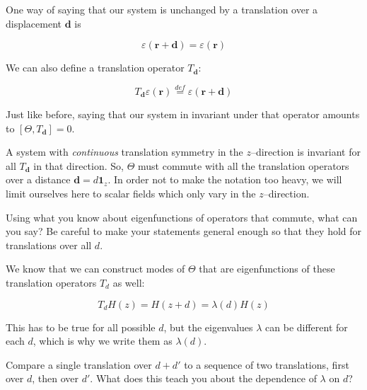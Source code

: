 \pagebreak


One way of saying that our system is unchanged by a translation over a displacement ${\mathbf d}$ is

\begin{equation}
\varepsilon ({\mathbf r} + {\mathbf d}) =  \varepsilon ({\mathbf r})
\end{equation} 

We can also define a translation operator $T_{\mathbf d}$:

\begin{equation}
T_{\mathbf d} \varepsilon ({\mathbf r}) \stackrel{def}{=} \varepsilon ({\mathbf r} + {\mathbf d})
\end{equation} 

Just like before, saying that our system in invariant under that operator amounts to $[\Theta, T_{\mathbf d}] = 0$.

A system with \emph{continuous} translation symmetry in the $z$--direction is invariant for all $T_{\mathbf d}$ in that direction. So, $\Theta$ must commute with all the translation operators over a distance ${\mathbf d} = d {\mathbf 1}_z$. In order not to make the notation too heavy, we will limit ourselves here to scalar fields which only vary in the $z$--direction.

\begin{cue}
  Using what you know about eigenfunctions of operators that commute, what can you say? Be careful to make your statements general enough so that they hold for translations over all ${d}$.
\end{cue}

We know that we can construct modes of $\Theta$ that are eigenfunctions of these translation operators $T_d$ as well:

\begin{equation}
T_d H(z) = H(z + d) = \lambda(d) H(z)
\end{equation} 

This has to be true for all possible $d$, but the eigenvalues $\lambda$ can be different for each $d$, which is why we write them as $\lambda(d)$. 

\begin{cue}
Compare a single translation over $d+d'$ to a sequence of two translations, first over $d$, then over $d'$. What does this teach you about the dependence of $\lambda$ on $d$?
\end{cue}

